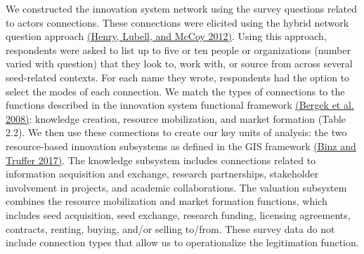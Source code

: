 \documentclass[twoside,12pt,final]{ucthesis-CA2012}
\begin{document}
\begin{ucmainmatter}
We constructed the innovation system network using the survey questions
related to actors\textquotesingle{} connections. These connections were elicited using
the \textquotesingle hybrid\textquotesingle{} network question approach \href{https://www.zotero.org/google-docs/?zdREFy}{(Henry, Lubell, and McCoy
2012)}. Using this approach,
respondents were asked to list up to five or ten people or organizations
(number varied with question) that they look to, work with, or source
from across several seed-related contexts. For each name they wrote,
respondents had the option to select the modes of each connection. We
match the types of connections to the functions described in the
innovation system functional framework \href{https://www.zotero.org/google-docs/?HTjSPs}{(Bergek et al.
2008)}: knowledge creation,
resource mobilization, and market formation (Table 2.2). We then use
these connections to create our key units of analysis: the two
resource-based innovation subsystems as defined in the GIS framework
\href{https://www.zotero.org/google-docs/?oVUw7o}{(Binz and Truffer 2017)}.
The knowledge subsystem includes connections related to information
acquisition and exchange, research partnerships, stakeholder involvement
in projects, and academic collaborations. The valuation subsystem
combines the resource mobilization and market formation functions, which
includes seed acquisition, seed exchange, research funding, licensing
agreements, contracts, renting, buying, and/or selling to/from. These
survey data do not include connection types that allow us to
operationalize the legitimation function.
\begin{table}


\end{table}
\end{ucmainmatter}
\end{document}
